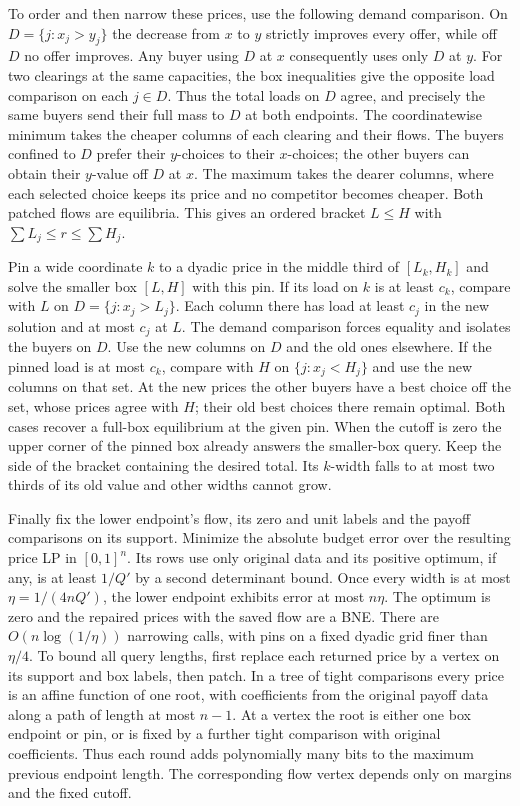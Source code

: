 \documentclass[11pt,oneside,openany,notitlepage]{report}
\begin{document}
To order and then narrow these prices, use the following demand
comparison. On \(D=\{j:x_j>y_j\}\) the decrease from \(x\) to \(y\)
strictly improves every offer, while off \(D\) no offer improves.
Any buyer using \(D\) at \(x\) consequently uses only \(D\) at \(y\).
For two clearings at the same capacities, the box inequalities give the
opposite load comparison on each \(j\in D\). Thus the total loads on
\(D\) agree, and precisely the same buyers send their full mass to \(D\)
at both endpoints. The coordinatewise minimum takes the cheaper
columns of each clearing and their flows. The buyers confined to \(D\)
prefer their \(y\)-choices to their \(x\)-choices; the other buyers can
obtain their \(y\)-value off \(D\) at \(x\). The maximum takes the
dearer columns, where each selected choice keeps its price and no
competitor becomes cheaper. Both patched flows are equilibria. This
gives an ordered bracket \(L\le H\) with \(\sum L_j\le r\le\sum H_j\).

Pin a wide coordinate \(k\) to a dyadic price in the middle third of
\([L_k,H_k]\) and solve the smaller box \([L,H]\) with this pin.
If its load on \(k\) is at least \(c_k\), compare with \(L\) on
\(D=\{j:x_j>L_j\}\). Each column there has load at least \(c_j\) in the
new solution and at most \(c_j\) at \(L\). The demand comparison forces
equality and isolates the buyers on \(D\). Use the new columns on \(D\)
and the old ones elsewhere. If the pinned load is at most \(c_k\),
compare with \(H\) on \(\{j:x_j<H_j\}\) and use the new columns on
that set. At the new prices the other buyers have a best choice off
the set, whose prices agree with \(H\); their old best choices there
remain optimal. Both cases recover a full-box equilibrium at the given
pin. When the cutoff is zero the upper corner of the pinned box already
answers the smaller-box query. Keep the side of the bracket containing
the desired total. Its \(k\)-width falls to at most two thirds of its old value
and other widths cannot grow.

Finally fix the lower endpoint's flow, its zero and unit labels and
the payoff comparisons on its support. Minimize the absolute budget
error over the resulting price LP in \([0,1]^n\). Its rows use only
original data and its positive optimum, if any, is at least \(1/Q'\)
by a second determinant bound. Once every width is at most
\(\eta=1/(4nQ')\), the lower endpoint exhibits error at most \(n\eta\).
The optimum is zero and the repaired prices with the saved flow are a
BNE. There are \(O(n\log(1/\eta))\) narrowing calls, with pins on a
fixed dyadic grid finer than \(\eta/4\). To bound all query lengths,
first replace each returned price by a vertex on its support and box
labels, then patch. In a tree of tight comparisons every price is
an affine function of one root, with coefficients from the original
payoff data along a path of length at most \(n-1\). At a vertex the root
is either one box endpoint or pin, or is fixed by a further tight
comparison with original coefficients. Thus each round adds polynomially
many bits to the maximum previous endpoint length. The corresponding
flow vertex depends only on margins and the fixed cutoff.
\end{document}
